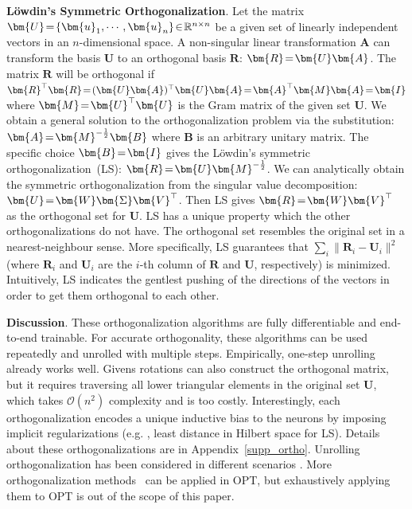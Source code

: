 \textbf{Löwdin's Symmetric Orthogonalization}. Let the matrix $\thickmuskip=2mu \medmuskip=2mu \bm{U}= \{\bm{u}_1,\cdots,\bm{u}_n\}\in\mathbb{R}^{n\times n}$ be a given set of linearly independent vectors in an $n$-dimensional space. A non-singular linear transformation $\bm{A}$ can transform the basis $\bm{U}$ to an orthogonal basis $\bm{R}$: $\thickmuskip=2mu \medmuskip=2mu \bm{R}=\bm{U}\bm{A}$. The matrix $\bm{R}$ will be orthogonal if 
$\thickmuskip=2mu \medmuskip=2mu \bm{R}^\top\bm{R} = (\bm{U}\bm{A})^\top \bm{U}\bm{A}=\bm{A}^\top\bm{M}\bm{A}=\bm{I}$
where $\thickmuskip=2mu \medmuskip=2mu \bm{M}=\bm{U}^\top\bm{U}$ is the Gram matrix of the given set $\bm{U}$. We obtain a general solution to the orthogonalization problem via the substitution: $\thickmuskip=2mu \medmuskip=2mu \bm{A}=\bm{M}^{-\frac{1}{2}}\bm{B}$ where $\bm{B}$ is an arbitrary unitary matrix. The specific choice $\thickmuskip=2mu \medmuskip=2mu \bm{B}=\bm{I}$ gives the Löwdin's symmetric orthogonalization~(LS): $\thickmuskip=2mu \medmuskip=2mu \bm{R}=\bm{U}\bm{M}^{-\frac{1}{2}}$. We can analytically obtain the symmetric orthogonalization from the singular value decomposition: $\thickmuskip=2mu \medmuskip=2mu \bm{U}=\bm{W}\bm{\Sigma}\bm{V}^\top$. Then LS gives $\thickmuskip=2mu \medmuskip=2mu\bm{R}=\bm{W}\bm{V}^\top$ as the orthogonal set for $\bm{U}$. LS has a unique property which the other orthogonalizations do not have. The orthogonal set resembles the original set in a nearest-neighbour sense. More specifically, LS guarantees that $\sum_i\|\bm{R}_i-\bm{U}_i\|^2$ (where $\bm{R}_i$ and $\bm{U}_i$ are the $i$-th column of $\bm{R}$ and $\bm{U}$, respectively) is minimized. Intuitively, LS indicates the gentlest pushing of the directions of the vectors in order to get them orthogonal to each other.

\textbf{Discussion}. These orthogonalization algorithms are fully differentiable and end-to-end trainable. For accurate orthogonality, these algorithms can be used repeatedly and unrolled with multiple steps. Empirically, one-step unrolling already works well. Givens rotations can also  construct the orthogonal matrix, but it requires traversing all lower triangular elements in the original set $\bm{U}$, which takes $\mathcal{O}(n^2)$ complexity and is too costly. Interestingly, each orthogonalization encodes a unique inductive bias to the neurons by imposing implicit regularizations (e.g. , least distance in Hilbert space for LS). Details about these orthogonalizations are in Appendix~\ref{supp_ortho}. Unrolling orthogonalization has been considered in different scenarios \cite{huang2018orthogonal,tang2019orthogonal,mhammedi2017efficient}. More orthogonalization methods~\cite{lezcano2019trivializations} can be applied in OPT, but exhaustively applying them to OPT is out of the scope of this paper.

